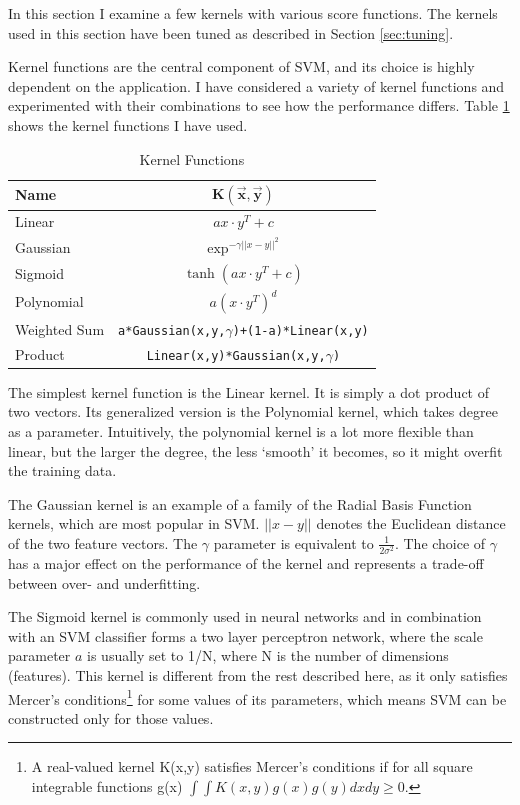 \documentclass[12pt,notitlepage,twoside]{scrreprt}
\begin{document}
In this section I examine a few kernels with various score functions. 
The kernels used in this section have been tuned as described in Section \ref{sec:tuning}.

Kernel functions are the central component of SVM, and its
choice is highly dependent on the application. I have considered a variety of
kernel functions and experimented with their combinations to see how the
performance differs. Table \ref{kfun} shows the kernel functions I have used.

\begin{table}[h]
\begin{center}
\begin{tabular}{|l|c|}
  \hline
  \textbf{Name} &\( \bm{K(\vec{x},\vec{y})}\)\\
  \hline\hline
  Linear  & \(ax\cdot y^T + c\)\\  
\hline
Gaussian  & \(\exp^{-\gamma ||x-y||^2}\)\\
\hline
Sigmoid   &   \(\tanh(ax \cdot y^T + c)\)\\
\hline
Polynomial& \(a(x\cdot y^T)^d\)  \\
\hline
Weighted Sum&  \texttt{a*Gaussian(x,y,\(\gamma\))+(1-a)*Linear(x,y)}\\
\hline
Product     & \texttt{Linear(x,y)*Gaussian(x,y,\(\gamma\))}\\
\hline
\end{tabular}
\end{center}
\caption{Kernel Functions \label{kfun}}
\end{table}

The simplest kernel function is the Linear kernel. It is simply a dot product
of two vectors. Its generalized version is the Polynomial kernel, which takes
degree as a parameter. Intuitively, the polynomial kernel is a lot more
flexible than linear, but the larger the degree, the less `smooth' it becomes,
so it might overfit the training data.  

The Gaussian kernel is an example of a family of the Radial Basis Function kernels, which
are
most popular in SVM. \(||x-y||\) denotes the
Euclidean distance of the two feature vectors. The \(\gamma\) parameter is
equivalent to \(\frac{1}{2\sigma^2}\). The choice of \(\gamma\) has a major
effect on the performance of the kernel and represents a trade-off between over-
and underfitting. 

The Sigmoid kernel is commonly used in neural networks
and in combination with an SVM classifier forms a two layer perceptron network,
where the scale parameter \(a\) is usually set to 1/N, where N is the number of
dimensions (features)\cite{sigmoid}. This kernel is different from the rest described
here, as it only satisfies Mercer's conditions\footnote{A real-valued kernel K(x,y) satisfies
Mercer's conditions if for all square integrable functions g(x) \(\int\int
K(x,y)g(x)g(y)dxdy\geq 0.\)} for some values of its parameters, which
	means SVM can be constructed only for those values\cite{stat_learn}.
\end{document}
